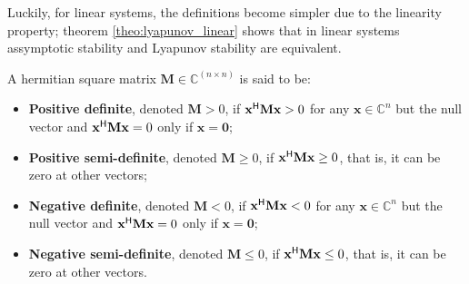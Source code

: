 	Luckily, for linear systems, the definitions become simpler due to the linearity property; theorem \ref{theo:lyapunov_linear} shows that in linear systems assymptotic stability and Lyapunov stability are equivalent.

\begin{definition} A hermitian square matrix $\mathbf{M}\in\mathbb{C}^{(n\times n)}$ is said to be:
\begin{itemize}
	\item \textbf{Positive definite}, denoted $\mathbf{M} > 0$, if $\mathbf{x}^{\mathsf{H}}\mathbf{Mx} > 0$ for any $\mathbf{x}\in\mathbb{C}^n$ but the null vector and $\mathbf{x}^{\mathsf{H}}\mathbf{Mx} = 0$ only if $\mathbf{x=0}$;
	\item \textbf{Positive semi-definite}, denoted $\mathbf{M} \geq 0$, if  $\mathbf{x}^{\mathsf{H}}\mathbf{Mx} \geq 0$, that is, it can be zero at other vectors;
	\item \textbf{Negative definite}, denoted $\mathbf{M} < 0$, if $\mathbf{x}^{\mathsf{H}}\mathbf{Mx} < 0$ for any $\mathbf{x}\in\mathbb{C}^n$ but the null vector and $\mathbf{x}^{\mathsf{H}}\mathbf{Mx} = 0$ only if $\mathbf{x=0}$;
	\item \textbf{Negative semi-definite}, denoted $\mathbf{M} \leq 0$, if  $\mathbf{x}^{\mathsf{H}}\mathbf{Mx} \leq 0$, that is, it can be zero at other vectors.
\end{itemize}
\end{definition}

